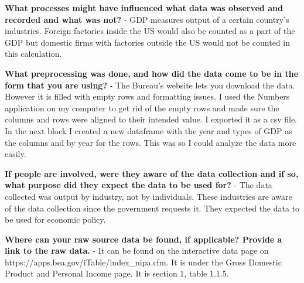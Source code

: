 \documentclass[11pt]{article}
\begin{document}
\textbf{What processes might have influenced what data was observed and
recorded and what was not?} - GDP measures output of a certain country's
industries. Foreign factories inside the US would also be counted as a
part of the GDP but domestic firms with factories outside the US would
not be counted in this calculation.

\textbf{What preprocessing was done, and how did the data come to be in
the form that you are using?} - The Bureau's website lets you download
the data. However it is filled with empty rows and formatting issues. I
used the Numbers application on my computer to get rid of the empty rows
and made sure the columns and rows were aligned to their intended value.
I exported it as a csv file. In the next block I created a new dataframe
with the year and types of GDP as the columns and by year for the rows.
This was so I could analyze the data more easily.

\textbf{If people are involved, were they aware of the data collection
and if so, what purpose did they expect the data to be used for?} - The
data collected was output by industry, not by individuals. These
industries are aware of the data collection since the government
requests it. They expected the data to be used for economic policy.

\textbf{Where can your raw source data be found, if applicable? Provide
a link to the raw data.} - It can be found on the interactive data page
on https://apps.bea.gov/iTable/index\_nipa.cfm. It is under the Gross
Domestic Product and Personal Income page. It is section 1, table 1.1.5.
\end{document}
